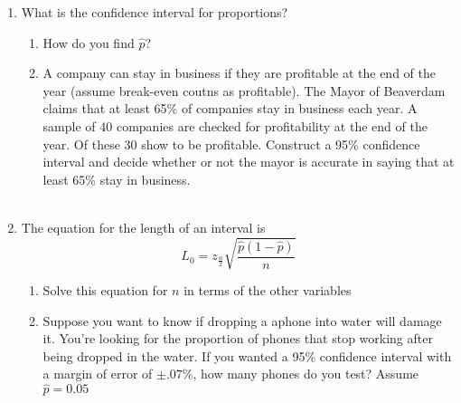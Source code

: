 \documentclass{article}
\begin{document}
\newpage
\begin{enumerate}
\item What is the confidence interval for proportions? 
\begin{enumerate}
\item How do you find $\hat{p}$?
\item A company can stay in business if they are profitable at the end of the year (assume break-even coutns as profitable). The Mayor of Beaverdam claims that at least 65\% of companies stay in business each year. A sample of 40 companies are checked for profitability at the end of the year. Of these 30 show to be profitable. Construct a 95\% confidence interval and decide whether or not the mayor is accurate in saying that at least 65\% stay in business.
\\ \\
\end{enumerate}
\item The equation for the length of an interval is 
\begin{equation*}
L_{0} = z_{\frac{\alpha}{2}}\sqrt{\frac{\hat{p}(1-\hat{p})}{n}}
\end{equation*}
\begin{enumerate}
\item Solve this equation for $n$ in terms of the other variables
\item Suppose you want to know if dropping a aphone into water will damage it. You're looking for the proportion of phones that stop working after being dropped in the water. If you wanted a 95\% confidence interval with a margin of error of $\pm .07\%$, how many phones do you test? Assume $\hat{p}=0.05$
\end{enumerate}
\end{enumerate}
\newpage
\end{document}
